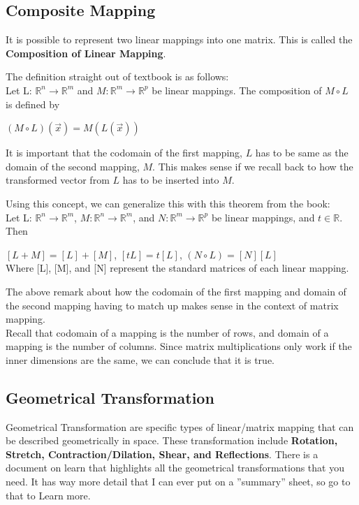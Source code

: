 \documentclass[12pt]{article}
\newcommand{\R}{\mathbb{R}}
\begin{document}
\subsection{Composite Mapping}
It is possible to represent two linear mappings into one matrix. This is called the \textbf{Composition of Linear Mapping}.

The definition straight out of textbook is as follows:\\
Let L: $\R^n \rightarrow \R^m$ and $M: \R^m \rightarrow \R^p$ be linear mappings. The composition of $M \circ L$ is defined by \\
\begin{center}
$(M \circ L)(\vec{x}) = M(L(\vec{x}))$
\end{center} 
\cite{textbook}
It is important that the codomain of the first mapping, $L$ has to be same as the domain of the second mapping, $M$. This makes sense if we recall back to how the transformed vector from $L$ has to be inserted into $M$.


Using this concept, we can generalize this with this theorem from the book:\\
Let L: $\R^n \rightarrow \R^m$, $M: \R^n \rightarrow \R^m$, and $N: \R^m \rightarrow \R^p$  be linear mappings, and $t \in \R$. Then\\
\begin{center}
$[L+M] = [L] + [M]$, $[tL] = t[L]$, $(N \circ L) = [N][L]$\\
Where [L], [M], and [N] represent the standard matrices of each linear mapping.
\end{center} 
\cite{textbook}
The above remark about how the codomain of the first mapping and domain of the second mapping having to match up makes sense in the context of matrix mapping.\\
Recall that codomain of a mapping is the number of rows, and domain of a mapping is the number of columns. Since matrix multiplications only work if the inner dimensions are the same, we can conclude that it is true.\\


\subsection{Geometrical Transformation}
Geometrical Transformation are specific types of linear/matrix mapping that can be described geometrically in space. These transformation include \textbf{Rotation, Stretch, Contraction/Dilation, Shear, and Reflections}. There is a document on learn that highlights all the geometrical transformations that you need. It has way more detail that I can ever put on a ''summary'' sheet, so go to that to Learn more.
\end{document}
